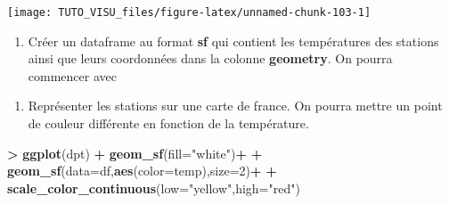 \documentclass[]{article}
\newenvironment{Shaded}{\begin{snugshade}}{\end{snugshade}}
\newcommand{\DataTypeTok}[1]{\textcolor[rgb]{0.13,0.29,0.53}{#1}}
\newcommand{\DecValTok}[1]{\textcolor[rgb]{0.00,0.00,0.81}{#1}}
\newcommand{\KeywordTok}[1]{\textcolor[rgb]{0.13,0.29,0.53}{\textbf{#1}}}
\newcommand{\NormalTok}[1]{#1}
\newcommand{\OperatorTok}[1]{\textcolor[rgb]{0.81,0.36,0.00}{\textbf{#1}}}
\newcommand{\StringTok}[1]{\textcolor[rgb]{0.31,0.60,0.02}{#1}}
\providecommand{\tightlist}{%
  \setlength{\itemsep}{0pt}\setlength{\parskip}{0pt}}
\theoremstyle{definition}
\theoremstyle{definition}
\theoremstyle{definition}
\theoremstyle{remark}
\begin{document}
\begin{center}\texttt{[image: TUTO\_VISU\_files/figure-latex/unnamed-chunk-103-1]} \end{center}

\begin{enumerate}
\def\labelenumi{\arabic{enumi}.}
\setcounter{enumi}{2}
\tightlist
\item
  Créer un dataframe au format \textbf{sf} qui contient les températures des stations ainsi que leurs coordonnées dans la colonne \textbf{geometry}. On pourra commencer avec
\end{enumerate}

\begin{Shaded}
\end{Shaded}

\begin{Shaded}
\end{Shaded}

\begin{enumerate}
\def\labelenumi{\arabic{enumi}.}
\setcounter{enumi}{3}
\tightlist
\item
  Représenter les stations sur une carte de france. On pourra mettre un point de couleur différente en fonction de la température.
\end{enumerate}

\begin{Shaded}
\begin{Highlighting}[]
\OperatorTok{>}\StringTok{ }\KeywordTok{ggplot}\NormalTok{(dpt) }\OperatorTok{+}\StringTok{ }\KeywordTok{geom_sf}\NormalTok{(}\DataTypeTok{fill=}\StringTok{"white"}\NormalTok{)}\OperatorTok{+}
\OperatorTok{+}\StringTok{   }\KeywordTok{geom_sf}\NormalTok{(}\DataTypeTok{data=}\NormalTok{df,}\KeywordTok{aes}\NormalTok{(}\DataTypeTok{color=}\NormalTok{temp),}\DataTypeTok{size=}\DecValTok{2}\NormalTok{)}\OperatorTok{+}
\OperatorTok{+}\StringTok{   }\KeywordTok{scale_color_continuous}\NormalTok{(}\DataTypeTok{low=}\StringTok{"yellow"}\NormalTok{,}\DataTypeTok{high=}\StringTok{"red"}\NormalTok{)}
\end{Highlighting}
\end{Shaded}
\end{document}
